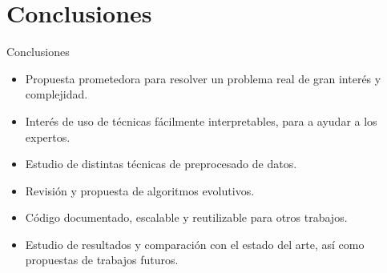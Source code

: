 \documentclass{beamer}
\begin{document}
\section{Conclusiones}
\begin{frame}{Conclusiones}

	\begin{itemize}
		\item Propuesta prometedora para resolver un problema real de gran interés y complejidad.
		\item Interés de uso de técnicas fácilmente interpretables, para a ayudar a los expertos.
		\item Estudio de distintas técnicas de preprocesado de datos.
		\item Revisión y propuesta de algoritmos evolutivos.
		\item Código documentado, escalable y reutilizable para otros trabajos.
		\item Estudio de resultados y comparación con el estado del arte, así como propuestas de trabajos futuros.
	\end{itemize}

\end{frame}
\end{document}
